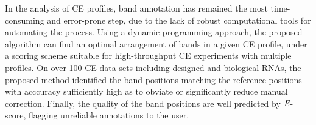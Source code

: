 In the analysis of CE profiles, band annotation has remained the most time-consuming and error-prone step, due to the lack of robust computational tools for automating the process. Using a dynamic-programming approach, the proposed algorithm can find an optimal arrangement of bands in a given CE profile, under a scoring scheme suitable for high-throughput CE experiments with multiple profiles. On over 100 CE data sets including designed and biological RNAs, the proposed method identified the band positions matching the reference positions with acccuracy sufficiently high as to obviate or significantly reduce manual correction. Finally, the quality of the band positions are well predicted by ${\emph{E}}$-score, flagging unreliable annotations to the user.
